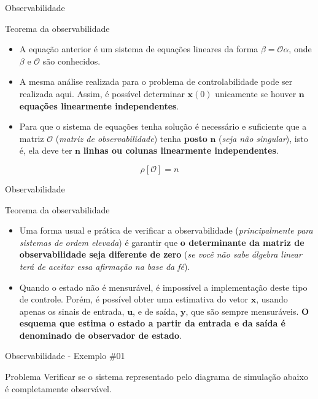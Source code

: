 \begin{frame}{Observabilidade}
\begin{block}{Teorema da observabilidade}
\begin{itemize}
    \item A equação anterior é um sistema de equações lineares da forma $\beta = \mathcal{O} \alpha$, onde $\beta$ e $\mathcal{O}$ são conhecidos.
    \item A mesma análise realizada para o problema de controlabilidade pode ser realizada aqui. Assim, é possível determinar $\bm{x}(0)$ unicamente se houver $\bm{n}$ \textbf{equações linearmente independentes}.
    \item Para que o sistema de equações tenha solução é necessário e suficiente que a  matriz $\mathcal{O}$ (\textit{matriz de observabilidade}) tenha \textbf{posto} $\bm{n}$ (\textit{seja não singular}), isto é, ela deve ter $\bm{n}$ \textbf{linhas ou colunas linearmente independentes}.
\end{itemize}
$$\boxed{\rho[\mathcal{O}] = n}$$
\end{block}
\end{frame}

\begin{frame}{Observabilidade}
\begin{block}{Teorema da observabilidade}
\begin{itemize}
    \item Uma forma usual e prática de verificar a observabilidade (\textit{principalmente para sistemas de ordem elevada}) é garantir que \textbf{o determinante da matriz de observabilidade seja diferente de zero} (\textit{se você não sabe álgebra linear terá de aceitar essa afirmação na base da fé}).
    \item Quando o estado não é mensurável, é impossível a implementação deste tipo de controle. Porém, é possível obter uma estimativa do vetor $\bm{x}$, usando apenas os sinais de entrada, $\bm{u}$, e de saída, $\bm{y}$, que são sempre mensuráveis. \textbf{O esquema que estima o estado a partir da entrada e da saída é denominado de observador de estado}.
\end{itemize}
\end{block}
\end{frame}

\begin{frame}{Observabilidade - Exemplo \#01}
\begin{block}{Problema}
Verificar se o sistema representado pelo diagrama de simulação abaixo é completamente observável.
\end{block}
\vspace{0,4 cm}
\centering
\scalebox{.65}{}
\end{frame}

